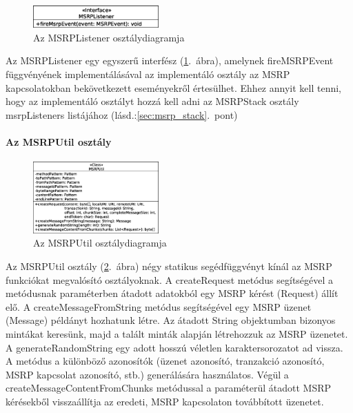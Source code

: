 \begin{figure}
  \vspace{-15pt}
  \begin{center}
    \includegraphics[width=0.43\textwidth]{img/class_diagrams/MSRPListener.eps}
  \end{center}
  \vspace{-15pt}
  \captionsetup{font=scriptsize}
  \caption{Az MSRPListener osztálydiagramja}
   \label{fig:class_listener}
  \vspace{-10pt}
\end{figure}
Az MSRPListener egy egyszerű interfész (\ref{fig:class_listener}.~ábra), amelynek fireMSRPEvent függvényének implementálásával az implementáló osztály az MSRP kapcsolatokban bekövetkezett eseményekről értesülhet. Ehhez annyit kell tenni, hogy az implementáló osztályt hozzá kell adni az MSRPStack osztály msrpListeners listájához (lásd.:\ref{sec:msrp_stack}.~pont)

\paragraph{Az MSRPUtil osztály\\}
\label{sec:msrp_util}

\begin{figure}
  \vspace{-15pt}
  \begin{center}
    \includegraphics[width=0.43\textwidth]{img/class_diagrams/MSRPUtil.eps}
  \end{center}
  \vspace{-15pt}
  \captionsetup{font=scriptsize}
  \caption{Az MSRPUtil osztálydiagramja}
   \label{fig:class_util}
  \vspace{-10pt}
\end{figure}
Az MSRPUtil osztály (\ref{fig:class_util}.~ábra) négy statikus segédfüggvényt kínál az MSRP funkciókat megvalósító osztályoknak. A createRequest metódus segítségével a metódusnak paraméterben átadott adatokból egy MSRP kérést (Request) állít elő. A createMessageFromString metódus segítségével egy MSRP üzenet (Message) példányt hozhatunk létre. Az átadott String objektumban bizonyos mintákat keresünk, majd a talált minták alapján létrehozzuk az MSRP üzenetet. A generateRandomString egy adott hosszú véletlen karaktersorozatot ad vissza. A metódus a különböző azonosítók (üzenet azonosító, tranzakció azonosító, MSRP kapcsolat azonosító, stb.) generálására használatos. Végül a createMessageContentFromChunks metódussal a paraméterül átadott MSRP kérésekből visszaállítja az eredeti, MSRP kapcsolaton továbbított üzenetet.